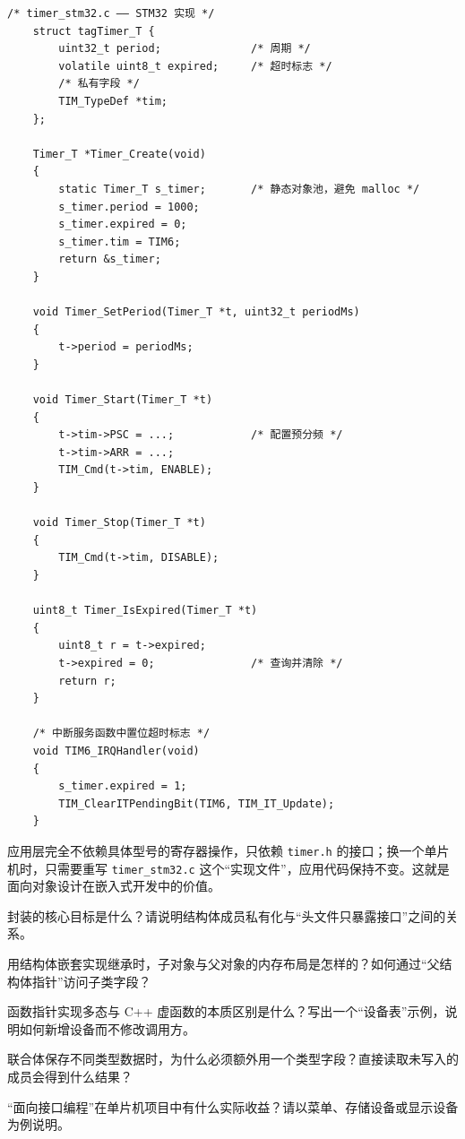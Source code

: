 \begin{lstlisting}[style=c]
	/* timer_stm32.c —— STM32 实现 */
	struct tagTimer_T {
		uint32_t period;              /* 周期 */
		volatile uint8_t expired;     /* 超时标志 */
		/* 私有字段 */
		TIM_TypeDef *tim;
	};
	
	Timer_T *Timer_Create(void)
	{
		static Timer_T s_timer;       /* 静态对象池，避免 malloc */
		s_timer.period = 1000;
		s_timer.expired = 0;
		s_timer.tim = TIM6;
		return &s_timer;
	}
	
	void Timer_SetPeriod(Timer_T *t, uint32_t periodMs)
	{
		t->period = periodMs;
	}
	
	void Timer_Start(Timer_T *t)
	{
		t->tim->PSC = ...;            /* 配置预分频 */
		t->tim->ARR = ...;
		TIM_Cmd(t->tim, ENABLE);
	}
	
	void Timer_Stop(Timer_T *t)
	{
		TIM_Cmd(t->tim, DISABLE);
	}
	
	uint8_t Timer_IsExpired(Timer_T *t)
	{
		uint8_t r = t->expired;
		t->expired = 0;               /* 查询并清除 */
		return r;
	}
	
	/* 中断服务函数中置位超时标志 */
	void TIM6_IRQHandler(void)
	{
		s_timer.expired = 1;
		TIM_ClearITPendingBit(TIM6, TIM_IT_Update);
	}
\end{lstlisting}

应用层完全不依赖具体型号的寄存器操作，只依赖 \texttt{timer.h} 的接口；换一个单片机时，只需要重写 \texttt{timer\_stm32.c} 这个“实现文件”，应用代码保持不变。这就是面向对象设计在嵌入式开发中的价值。

\begin{problemset}
\item 封装的核心目标是什么？请说明结构体成员私有化与“头文件只暴露接口”之间的关系。
\item 用结构体嵌套实现继承时，子对象与父对象的内存布局是怎样的？如何通过“父结构体指针”访问子类字段？
\item 函数指针实现多态与 C++ 虚函数的本质区别是什么？写出一个“设备表”示例，说明如何新增设备而不修改调用方。
\item 联合体保存不同类型数据时，为什么必须额外用一个类型字段？直接读取未写入的成员会得到什么结果？
\item “面向接口编程”在单片机项目中有什么实际收益？请以菜单、存储设备或显示设备为例说明。
\end{problemset}
